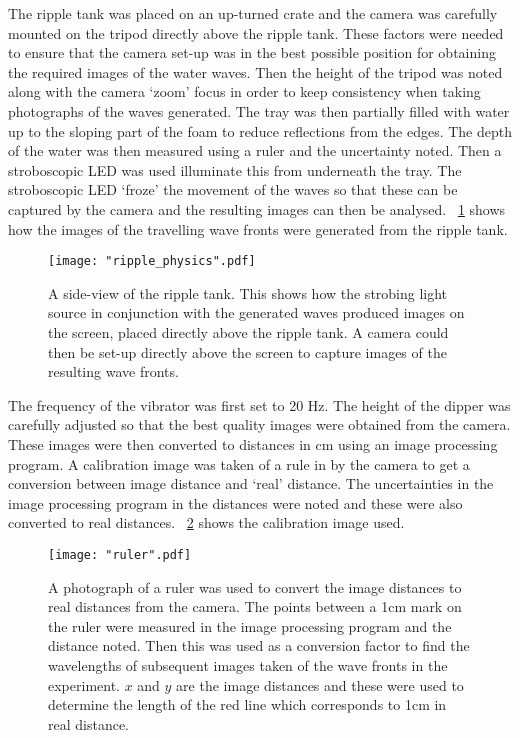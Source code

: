 \documentclass{article}
\newcommand{\figref}[2][\figurename~]{#1\ref{#2}}
\begin{document}
\vspace{2mm}
\noindent
The ripple tank was placed on an up-turned crate and the camera was carefully mounted on the tripod directly above the ripple tank. These factors were needed to ensure that the camera set-up was in the best possible position for obtaining the required images of the water waves. Then the height of the tripod was noted along with the camera `zoom' focus in order to keep consistency when taking photographs of the waves generated. The tray was then partially filled with water up to the sloping part of the foam \cite{Paper01} to reduce reflections from the edges. The depth of the water was then measured using a ruler and the uncertainty noted. Then a stroboscopic LED was used illuminate this from underneath the tray. The stroboscopic LED `froze' the movement of the waves so that these can be captured by the camera and the resulting images can then be analysed. \figref{fig:ripple_setup} shows how the images of the travelling wave fronts were generated from the ripple tank.

\begin{figure}[h]
\centering
\texttt{[image: "ripple\_physics".pdf]}
\caption{A side-view of the ripple tank. This shows how the strobing light source in conjunction with the generated waves produced images on the screen, placed directly above the ripple tank. A camera could then be set-up directly above the screen to capture images of the resulting wave fronts.}
\label{fig:ripple_setup}
\end{figure}

\newpage
\vspace{2mm}
\noindent
The frequency of the vibrator was first set to 20 Hz. The height of the dipper was carefully adjusted so that the best quality images were obtained from the camera. These images were then converted to distances in cm using an image processing program. A calibration image was taken of a rule in by the camera to get a conversion between image distance and `real' distance. The uncertainties in the image processing program in the distances were noted and these were also converted to real distances. \figref{fig:ruler} shows the calibration image used. 

\begin{figure}[h]
\centering
\texttt{[image: "ruler".pdf]}
\caption{A photograph of a ruler was used to convert the image distances to real distances from the camera. The points between a 1cm mark on the ruler were measured in the image processing program and the distance noted. Then this was used as a conversion factor to find the wavelengths of subsequent images taken of the wave fronts in the experiment. $x$ and $y$ are the image distances and these were used to determine the length of the red line which corresponds to 1cm in real distance.}
\label{fig:ruler}
\end{figure}
\end{document}
